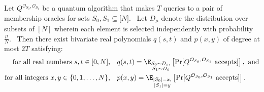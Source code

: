 \begin{lemma}
\label{lem:symmetrization} Let $Q^{\mathcal{O}_{S_{0}},\mathcal{O}_{S_{1}}}$
be a quantum algorithm that makes $T$ queries to a pair of membership
oracles for sets $S_{0},S_{1}\subseteq \lbrack N]$. \ Let $D_{\mu }$ denote
the distribution over subsets of $[N]$ wherein each element is selected
independently with probability $\frac{\mu }{N}$. \ Then there exist
bivariate real polynomials $q(s,t)$ and $p(x,y)$ of degree at most $2T$
satisfying:
\begin{align*}
\textrm{for all real numbers } s, t \in [0, N],& \quad
q(s,t)=\E_{\substack{ S_{0}\sim D_{s}, \\ S_{1}\sim D_{t}}}\left[ \Pr [Q^{
\mathcal{O}_{S_{0}},\mathcal{O}_{S_{1}}}\text{ accepts}]\right], \textrm{ and} \\
\textrm{for all integers } x, y \in \{0, 1, \dots, N\},& \quad
p(x,y)=\E_{\substack{ |S_{0}|=x, \\ |S_{1}|=y}}\left[ \Pr [Q^{\mathcal{O}
_{S_{0}},\mathcal{O}_{S_{1}}}\text{ accepts}]\right].
\end{align*}
\end{lemma}

